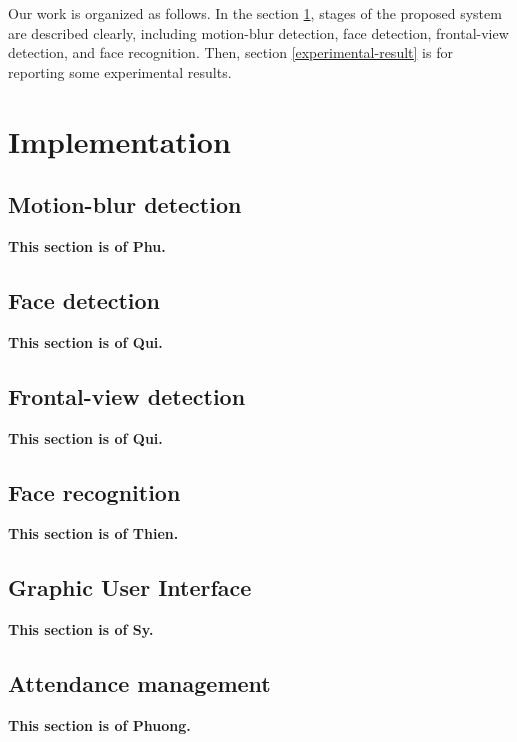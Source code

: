 \documentclass[journal, twocolumn]{IEEEtran}
\begin{document}
Our work is organized as follows. In the section \ref{implementation}, stages of the proposed system are described clearly, including motion-blur detection, face detection, frontal-view detection, and face recognition. Then, section \ref{experimental-result} is for reporting some experimental results.


\medskip
\section{Implementation}
\label{implementation}

\subsection{Motion-blur detection}
\label{motion-blur-detection}
\textbf{This section is of Phu.}

\subsection{Face detection}
\label{face-detection}
\textbf{This section is of Qui.}

\subsection{Frontal-view detection}
\label{frontal-view-detection}
\textbf{This section is of Qui.}

\subsection{Face recognition}
\label{face-recognition}
\textbf{This section is of Thien.}

\subsection{Graphic User Interface}
\label{gui}
\textbf{This section is of Sy.}


\subsection{Attendance management}
\label{attendance-management}
\textbf{This section is of Phuong.}
\end{document}

